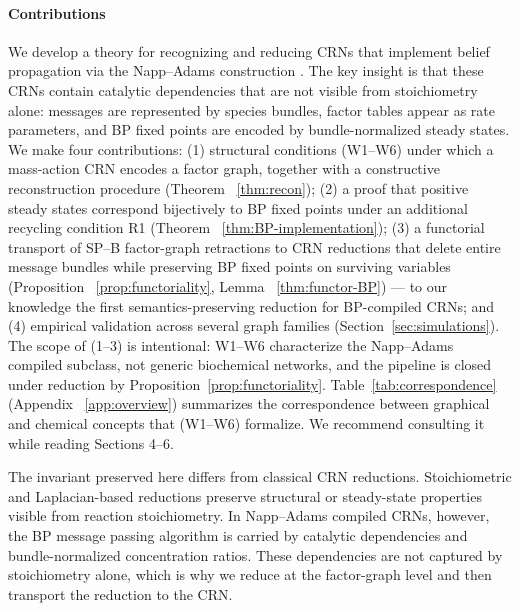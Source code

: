 \documentclass{article}
\theoremstyle{plain}
\theoremstyle{definition}
\theoremstyle{remark}
\newcommand{\<}{\langle}
\renewcommand{\>}{\rangle}
\begin{document}
\paragraph{Contributions} We develop a theory for recognizing and reducing CRNs that implement belief propagation via the Napp–Adams construction \cite{NIPS2013_e5e63da7}. The key insight is that these CRNs contain catalytic dependencies that are not visible from stoichiometry alone: messages are represented by species bundles, factor tables appear as rate parameters, and BP fixed points are encoded by bundle-normalized steady states. We make four contributions: (1) structural conditions (W1–W6) under which a mass-action CRN encodes a factor graph, together with a constructive reconstruction procedure (Theorem ~\ref{thm:recon}); (2) a proof that positive steady states correspond bijectively to BP fixed points under an additional recycling condition R1 (Theorem ~\ref{thm:BP-implementation}); (3) a functorial transport of SP–B factor-graph retractions to CRN reductions that delete entire message bundles while preserving BP fixed points on surviving variables (Proposition ~\ref{prop:functoriality}, Lemma ~\ref{thm:functor-BP}) — to our knowledge the first semantics-preserving reduction for BP-compiled CRNs; and (4) empirical validation across several graph families (Section~\ref{sec:simulations}). The scope of (1–3) is intentional: W1–W6 characterize the Napp–Adams compiled subclass, not generic biochemical networks, and the pipeline is closed under reduction by Proposition~\ref{prop:functoriality}. Table~\ref{tab:correspondence} (Appendix ~\ref{app:overview}) summarizes the correspondence between graphical and chemical concepts that (W1–W6) formalize. We recommend consulting it while reading Sections 4–6.

The invariant preserved here differs from classical CRN reductions.
Stoichiometric and Laplacian-based reductions preserve structural or
steady-state properties visible from reaction stoichiometry. In
Napp--Adams compiled CRNs, however, the BP message passing algorithm is carried by catalytic
dependencies and bundle-normalized concentration ratios. These dependencies
are not captured by stoichiometry alone, which is why we reduce at the
factor-graph level and then transport the reduction to the CRN.

\end{document}
